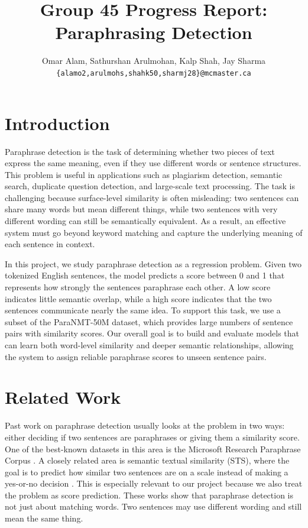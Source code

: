 \documentclass[11pt]{article}
\title{Group 45 Progress Report:\\Paraphrasing Detection}
\author{Omar Alam, Sathurshan Arulmohan, Kalp Shah, Jay Sharma \\
  \texttt{\{alamo2,arulmohs,shahk50,sharmj28\}@mcmaster.ca} }
\begin{document}
\maketitle

\section{Introduction}

Paraphrase detection is the task of determining whether two pieces of text express the same meaning, even if they use different words or sentence structures. This problem is useful in applications such as plagiarism detection, semantic search, duplicate question detection, and large-scale text processing. The task is challenging because surface-level similarity is often misleading: two sentences can share many words but mean different things, while two sentences with very different wording can still be semantically equivalent. As a result, an effective system must go beyond keyword matching and capture the underlying meaning of each sentence in context.

In this project, we study paraphrase detection as a regression problem. Given two tokenized English sentences, the model predicts a score between 0 and 1 that represents how strongly the sentences paraphrase each other. A low score indicates little semantic overlap, while a high score indicates that the two sentences communicate nearly the same idea. To support this task, we use a subset of the ParaNMT-50M dataset, which provides large numbers of sentence pairs with similarity scores. Our overall goal is to build and evaluate models that can learn both word-level similarity and deeper semantic relationships, allowing the system to assign reliable paraphrase scores to unseen sentence pairs.

\section{Related Work}
\label{sec:related-work}
Past work on paraphrase detection usually looks at the problem in two ways: either deciding if two sentences are paraphrases or giving them a similarity score. One of the best-known datasets in this area is the Microsoft Research Paraphrase Corpus \cite{dolan-brockett-2005}. A closely related area is semantic textual similarity (STS), where the goal is to predict how similar two sentences are on a scale instead of making a yes-or-no decision \cite{cer-etal-2017-semeval}. This is especially relevant to our project because we also treat the problem as score prediction. These works show that paraphrase detection is not just about matching words. Two sentences may use different wording and still mean the same thing.
\end{document}
